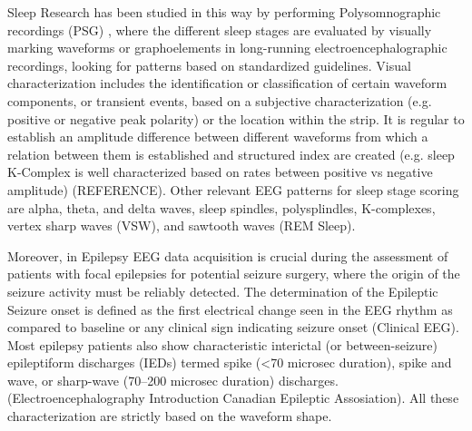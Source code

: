 \documentclass[sensors,article,submit,moreauthors,pdftex,10pt,a4paper]{mdpi}
\begin{document}
Sleep Research has been studied in this way by performing Polysomnographic recordings (PSG)  \citep{Rodenbeck2006}, where the different sleep stages are evaluated by visually marking waveforms or graphoelements in long-running electroencephalographic recordings, looking for patterns based on standardized guidelines.   Visual characterization includes the identification or classification of certain waveform components, or transient events, based on a subjective characterization (e.g. positive or negative peak polarity) or the location within the strip.  It is regular to establish an amplitude difference between different waveforms from which a relation between them is established and structured index are created (e.g. sleep K-Complex is well characterized based on rates between positive vs negative amplitude) (REFERENCE).  Other relevant EEG patterns for sleep stage scoring are alpha, theta, and delta waves,  sleep spindles, polysplindles, K-complexes, vertex sharp waves (VSW), and sawtooth waves (REM Sleep).

Moreover, in Epilepsy EEG data acquisition is crucial during the assessment of patients with focal epilepsies for potential seizure surgery, where the origin of the seizure activity must be reliably detected. The determination of the Epileptic Seizure onset is defined as the first electrical change seen in the EEG rhythm as compared to baseline or any clinical sign indicating seizure onset (Clinical EEG).   Most epilepsy patients also show characteristic interictal (or between-seizure) epileptiform discharges (IEDs) termed spike (<70 microsec duration), spike and wave, or sharp-wave (70–200 microsec duration) discharges. (Electroencephalography Introduction Canadian Epileptic Assosiation).  All these characterization are strictly based on the waveform shape.

\end{document}
